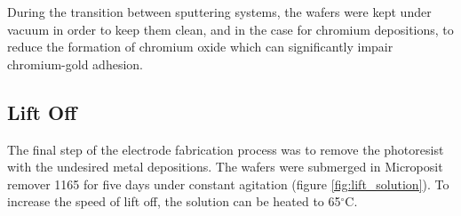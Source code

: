 \par During the transition between sputtering systems, the wafers were kept under vacuum in order to keep them clean, and in the case for chromium depositions, to reduce the formation of chromium oxide which can significantly impair chromium-gold adhesion.

\subsection*{Lift Off}

The final step of the electrode fabrication process was to remove the photoresist with the undesired metal depositions. The wafers were submerged in Microposit remover 1165 for five days under constant agitation (figure \ref{fig:lift_solution}). To increase the speed of lift off, the solution can be heated to 65$^\circ$C.

